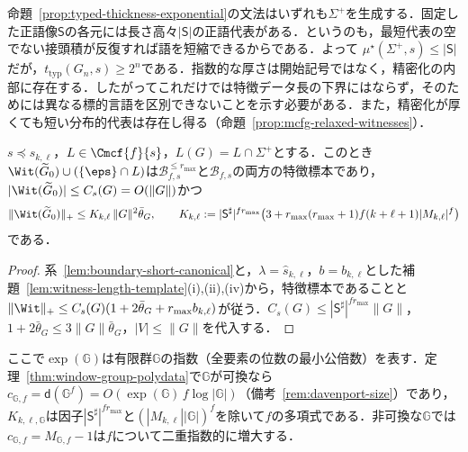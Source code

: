 \begin{remark}[精密化の障害が現れる場所]
\label{rem:refinement-vs-data}
命題~\ref{prop:typed-thickness-exponential}の文法はいずれも$\Sigma^+$を生成する．固定した正語像$\mathsf S$の各元には長さ高々$|\mathsf S|$の正語代表がある．というのも，最短代表の空でない接頭積が反復すれば語を短縮できるからである．よって
$\mu^\star(\Sigma^+,s)\le|\mathsf S|$だが，$t_{\mathrm{typ}}(G_n,s)\ge2^n$である．指数的な厚さは開始記号ではなく，精密化の内部に存在する．したがってこれだけでは特徴データ長の下界にはならず，そのためには異なる標的言語を区別できないことを示す必要がある．また，精密化が厚くても短い分布的代表は存在し得る（命題~\ref{prop:mcfg-relaxed-witnesses}）．
\end{remark}


\begin{theorem}
\label{thm:boundary-polydata}
$s\preceq s_{k,\ell}$，$L\in\Cmcf{f}{s}$，$L(G)=L\cap\Sigma^+$とする．このとき$\Wit(\widetilde G_0)\cup(\{\eps\}\cap L)$は$\mathcal B^{\le r_{\max}}_{f,s}$と$\mathcal B_{f,s}$の両方の特徴標本であり，$|\Wit(\widetilde G_0)|\le C_s(G)=O(\|G\|)$かつ
\[
 \|\Wit(\widetilde G_0)\|_+\le K_{k,\ell}\,\|G\|^2\bar\theta_G,\qquad
 K_{k,\ell}:=|\mathsf S^\sharp|^{fr_{\max}}
   \bigl(3+r_{\max}(r_{\max}+1)f(k+\ell+1)|M_{k,\ell}|^f\bigr)
\]
である．
\end{theorem}

\begin{proof}
系~\ref{lem:boundary-short-canonical}と，$\lambda=\widehat s_{k,\ell}$，$b=b_{k,\ell}$とした補題~\ref{lem:witness-length-template}(i),(ii),(iv)から，特徴標本であることと$\|\Wit\|_+\le C_s(G)(1+2\bar\theta_G+r_{\max}b_{k,\ell})$が従う．$C_s(G)\le|\mathsf S^\sharp|^{fr_{\max}}\|G\|$，$1+2\bar\theta_G\le3\|G\|\bar\theta_G$，$|V|\le\|G\|$を代入する．
\end{proof}



\begin{theorem}[窓・アーベル群型付けの多項式データ]
\label{thm:window-abelian-polydata}
ここで$\exp({\mathbb G})$は有限群${\mathbb G}$の指数（全要素の位数の最小公倍数）を表す．定理~\ref{thm:window-group-polydata}で${\mathbb G}$が可換なら$c_{{\mathbb G},f}=\mathsf d({\mathbb G}^f)=O(\exp({\mathbb G})\,f\log|{\mathbb G}|)$（備考~\ref{rem:davenport-size}）であり，$K_{k,\ell,{\mathbb G}}$は因子$|\mathsf S^\sharp|^{fr_{\max}}$と$(|M_{k,\ell}||{\mathbb G}|)^f$を除いて$f$の多項式である．非可換な${\mathbb G}$では$c_{{\mathbb G},f}=M_{{\mathbb G},f}-1$は$f$について二重指数的に増大する．
\end{theorem}

